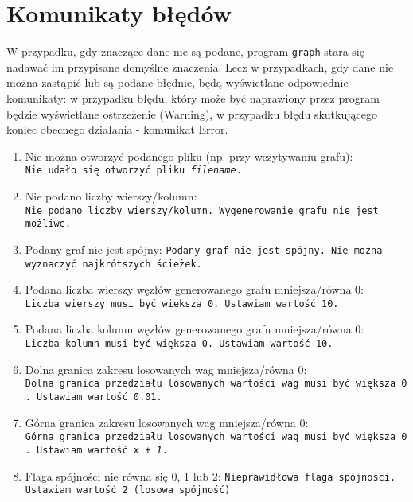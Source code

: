 \documentclass[]{article}
\begin{document}
\section{Komunikaty błędów}\label{header-n281}

W przypadku, gdy znaczące dane nie są podane, program \texttt{graph} stara się nadawać im przypisane domyślne znaczenia. Lecz w przypadkach, gdy dane nie można zastąpić lub są podane błędnie, będą wyświetlane odpowiednie komunikaty: w przypadku błędu, który może być naprawiony przez program będzie wyświetlane ostrzeżenie (Warning), w przypadku błędu skutkującego koniec obecnego działania - komunikat Error.

\begin{enumerate}
\def\labelenumi{\arabic{enumi}.}
\item
  Nie można otworzyć podanego pliku (np. przy wczytywaniu grafu):
  \texttt{Nie\ udało\ się\ otworzyć\ pliku\ \emph{filename}.}
\item
  Nie podano liczby wierszy/kolumn:
  \texttt{Nie\ podano\ liczby\ wierszy\texttt{/}kolumn.\ Wygenerowanie\ grafu nie jest możliwe. }
\item
  Podany graf nie jest spójny:
  \texttt{Podany\ graf\ nie\ jest\ spójny.\ Nie można wyznaczyć najkrótszych ścieżek.}
\item
  Podana liczba wierszy węzłów generowanego grafu mniejsza/równa 0:
  \texttt{Liczba\ wierszy\ musi\ być\ większa\ 0.\ Ustawiam\ wartość\ 10.}
\item
  Podana liczba kolumn węzłów generowanego grafu mniejsza/równa 0:
  \texttt{Liczba\ kolumn\ musi\ być\ większa\ 0.\ Ustawiam\ wartość\ 10.}
\item
  Dolna granica zakresu losowanych wag mniejsza/równa 0:
  \texttt{Dolna\ granica\ przedziału\ losowanych\ wartości\ wag\ musi\ być\ większa\ 0.\ Ustawiam\ wartość\ 0.01.}
\item
  Górna granica zakresu losowanych wag mniejsza/równa 0:
  \texttt{Górna\ granica\ przedziału\ losowanych\ wartości\ wag\ musi\ być\ większa\ 0.\ Ustawiam\ wartość\ \emph{x + 1}.}
\item 
    Flaga spójności nie równa się 0, 1 lub 2:
    \texttt{Nieprawidłowa flaga spójności. Ustawiam wartość 2 (losowa spójność)}
\end{enumerate}
\end{document}
